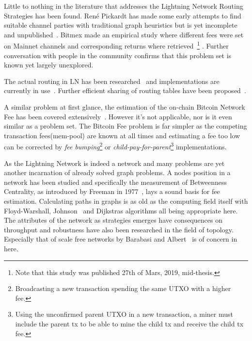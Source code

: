 	Little to nothing in the literature that addresses the Lightning Network Routing Strategies has been found. René Pickardt has made some early attempts to find suitable channel parties with traditional graph heuristics but is yet incomplete and unpublished~\cite{repository:rene:pickard}. Bitmex made an empirical study where different fees were set on Mainnet channels and corresponding returns where retrieved~\cite{bitmex:fee}\footnote{Note that this study was published 27th of Mars, 2019, mid-thesis.} . Further conversation with people in the community confirms that this problem set is known yet largely unexplored.
	
	The actual routing in LN has been researched~\cite{distasi:avallone:cononico:routing} and implementations are currently in use~\cite{repository:clightning, repository:lnd, repository:eclair, repository:lit}. Further efficient sharing of routing tables have been proposed~\cite{gunspan:marco:ant}.
	
	A similar problem at first glance, the estimation of the on-chain Bitcoin Network Fee has been covered extensively~\cite{mosterland:transaction:fee, houy:transaction:fee}. However it's not applicable, nor is it even similar as a problem set. The Bitcoin Fee problem is far simpler as the competing transaction fees(mem-pool) are known at all times and estimating a fee too low can be corrected by \textit{fee bumping}\footnote{Broadcasting a new transaction spending the same UTXO with a higher fee.} or \textit{child-pay-for-parent}\footnote{Using the unconfirmed parent UTXO in a new transaction, a miner must include the parent tx to be able to mine the child tx and receive the child tx fee.} implementations.
	
	As the Lightning Network is indeed a network and many problems are yet another incarnation of already solved graph problems. A nodes position in a network has been studied and specifically the measurement of Betweenness Centrality, as introduced by Freeman in 1977~\cite{brandes:betweenness:centrality:algorithm}, lays a sound basis for fee estimation. Calculating paths in graphs is as old as the computing field itself with Floyd-Warshall, Johnson~\cite{johnson:shortest:path:sparse:network} and Dijkstras algorithms all being appropriate here. The attributes of the network as strategies emerges have consequences on throughput and robustness have also been researched in the field of topology. Especially that of scale free networks by Barabasi and Albert~\cite{barabasi:albert:emergent:scaling} is of concern in here.
	
